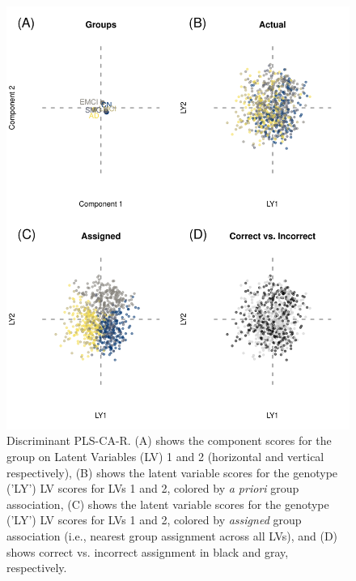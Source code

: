 \documentclass[12pt]{article}
\begin{document}
\begin{figure}[!hbtp]

{\centering \includegraphics[width=.8\textwidth,height=.8\textheight]{PLSCAR_to_a_GPLS_files/figure-latex/unnamed-chunk-6-1} 

}

\caption{\label{fig:discriminant_ex1} Discriminant PLS-CA-R. (A) shows the component scores for the group on Latent Variables (LV) 1 and 2 (horizontal and vertical respectively), (B) shows the latent variable scores for the genotype ('LY') LV scores for LVs 1 and 2, colored by \textit{a priori} group association, (C) shows the latent variable scores for the genotype ('LY') LV scores for LVs 1 and 2, colored by \textit{assigned} group association (i.e., nearest group assignment across all LVs), and (D) shows correct vs. incorrect assignment in black and gray, respectively.}\label{fig:unnamed-chunk-6}
\end{figure}
\end{document}

